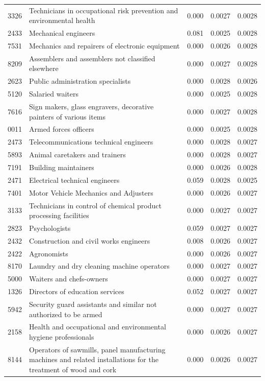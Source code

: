 \begin{longtable}{p{}>{\raggedright\arraybackslash}p{}rrr}
3326 & Technicians in occupational risk prevention and environmental health & 0.000 & 0.0027 & 0.0028 \\
2433 & Mechanical engineers & 0.081 & 0.0025 & 0.0028 \\
7531 & Mechanics and repairers of electronic equipment & 0.000 & 0.0026 & 0.0028 \\
8209 & Assemblers and assemblers not classified elsewhere & 0.000 & 0.0027 & 0.0028 \\
2623 & Public administration specialists & 0.000 & 0.0028 & 0.0026 \\
5120 & Salaried waiters & 0.000 & 0.0025 & 0.0028 \\
7616 & Sign makers, glass engravers, decorative painters of various items & 0.000 & 0.0027 & 0.0028 \\
0011 & Armed forces officers & 0.000 & 0.0025 & 0.0028 \\
2473 & Telecommunications technical engineers & 0.000 & 0.0028 & 0.0027 \\
5893 & Animal caretakers and trainers & 0.000 & 0.0028 & 0.0027 \\
7191 & Building maintainers & 0.000 & 0.0026 & 0.0028 \\
2471 & Electrical technical engineers & 0.059 & 0.0028 & 0.0025 \\
7401 & Motor Vehicle Mechanics and Adjusters & 0.000 & 0.0026 & 0.0027 \\
3133 & Technicians in control of chemical product processing facilities & 0.000 & 0.0027 & 0.0027 \\
2823 & Psychologists & 0.059 & 0.0027 & 0.0027 \\
2432 & Construction and civil works engineers & 0.008 & 0.0026 & 0.0027 \\
2422 & Agronomists & 0.000 & 0.0026 & 0.0027 \\
8170 & Laundry and dry cleaning machine operators & 0.000 & 0.0027 & 0.0027 \\
5000 & Waiters and chefs-owners & 0.000 & 0.0027 & 0.0027 \\
1326 & Directors of education services & 0.052 & 0.0027 & 0.0027 \\
5942 & Security guard assistants and similar not authorized to be armed & 0.000 & 0.0027 & 0.0027 \\
2158 & Health and occupational and environmental hygiene professionals & 0.000 & 0.0026 & 0.0027 \\
8144 & Operators of sawmills, panel manufacturing machines and related installations for the treatment of wood and cork & 0.000 & 0.0026 & 0.0027 \\

\end{longtable}
